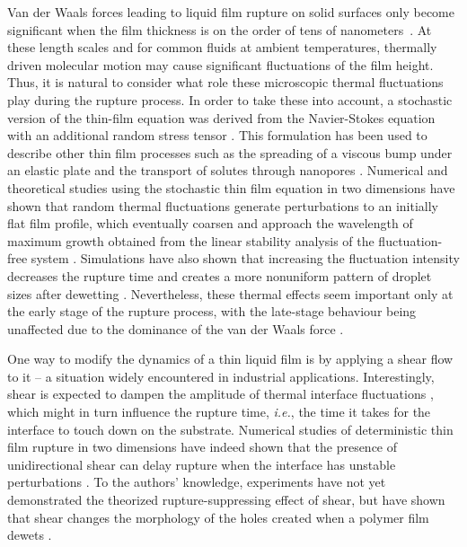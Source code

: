 \documentclass[
 onecolumn,
 amsmath,amssymb,
floatfix,superscriptaddress
]{revtex4-2}
\begin{document}
Van der Waals forces leading to liquid film rupture on solid surfaces only become significant when the film thickness is on the order of tens of nanometers~\cite{JacobsSeemannHerminghaus2008}. At these length scales and for common fluids at ambient temperatures, thermally driven molecular motion may cause significant fluctuations of the film height. Thus, it is natural to consider what role these microscopic thermal fluctuations play during the rupture process. In order to take these into account, a stochastic version of the thin-film equation was derived from the Navier-Stokes equation with an additional random stress tensor \cite{davidovitch2005,grun2006}. This formulation has been used to describe other thin film processes such as the spreading of a viscous bump under an elastic plate \cite{davidovitch2005,carlson_2018,pedersen_niven_salez_dalnoki-veress_carlson_2019} and the transport of solutes through nanopores \cite{marbach_dean_bocquet_2018}. Numerical and theoretical studies using the stochastic thin film equation in two dimensions have shown that random thermal fluctuations generate perturbations to an initially flat film profile, which eventually coarsen and approach the wavelength of maximum growth obtained from the linear stability analysis of the fluctuation-free system \cite{DiezFernandez2016,NesicKondic2015,MeckeRauscher_2005}. Simulations have also shown that increasing the fluctuation intensity decreases the rupture time and creates a more nonuniform pattern of droplet sizes after dewetting \cite{duran-olivenciakalliadasis,NesicKondic2015,ShahKreutzer}. Nevertheless, these thermal effects seem important only at the early stage of the  rupture process, with the late-stage behaviour being unaffected due to the dominance of the van der Waals force \cite{Zhaosprittles2022}.

One way to modify the dynamics of a thin liquid film is by applying a shear flow to it -- a situation widely encountered in industrial applications. Interestingly, shear is expected to dampen the amplitude of thermal interface fluctuations \cite{Derks2006,ThiebaudBickel2015,Bresson2017}, which might in turn influence the rupture time, \textit{i.e.}, the time it takes for the interface to touch down on the substrate. Numerical studies of deterministic thin film rupture in two dimensions have indeed shown that the presence of unidirectional shear can delay rupture when the interface has unstable perturbations \cite{KalpathyKumar2010,davis_gratton_davis_2010,Kadri2021}. To the authors' knowledge, experiments have not yet demonstrated the theorized rupture-suppressing effect of shear, but have shown that shear changes the morphology of the holes created when a polymer film dewets \cite{DmochowskaMiquelard-Garnier2022}. 
\end{document}
